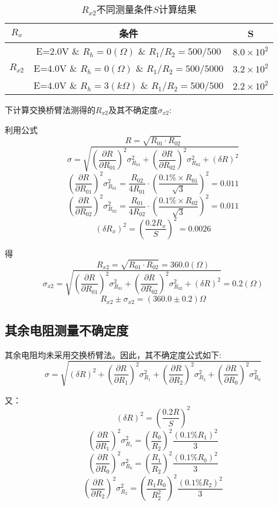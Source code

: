 \documentclass{ctexart}
\begin{document}
\begin{table}[H]
  \centering
  \caption{$R_{x2}$不同测量条件$S$计算结果}
    \begin{tabular}{|c|c|c|}
      \hline
    $R_x$ & 条件    & S \\
    \hline
    \multirow{3}[0]{*}{$R_{x2}$} & E=2.0V \& $R_h=0(\Omega )$ \& $R_1/R_2=500/500$ & $8.0 \times 10^2$ \\
    \cline{2-3}
          & E=4.0V \& $R_h=0(\Omega )$ \& $R_1/R_2=500/5000$ & $3.2 \times 10^2$ \\
          \cline{2-3}
          & E=4.0V \& $R_h=3(k\Omega )$ \& $R_1/R_2=500/500$ & $2.2 \times 10^2$ \\
          
          \hline
    \end{tabular}%
  \label{tab:addlabel}%
\end{table}%

 下计算交换桥臂法测得的$R_{x2}$及其不确定度$\sigma_{x2}$:
 
 利用公式$$R=\sqrt{R_{01}\cdot R_{02}}$$
$$\sigma=\sqrt{(\frac{\partial R}{\partial R_{01}})^2\sigma_{R_{01}}^2+(\frac{\partial R}{\partial R_{02}})^2\sigma_{R_{02}}^2+(\delta R)^2}$$
$$(\frac{\partial R}{\partial R_{01}})^2\sigma_{R_{01}}^2=\frac{R_{02}}{4R_{01}}\cdot (\frac{0.1\% \times R_{01}}{\sqrt{3}})^2=0.011$$
$$(\frac{\partial R}{\partial R_{02}})^2\sigma_{R_{02}}^2=\frac{R_{01}}{4R_{02}}\cdot (\frac{0.1\% \times R_{02}}{\sqrt{3}})^2=0.011$$
$$(\delta R_x)^2=(\frac{0.2R_x}{S})^2=0.0026$$

得
$$R_{x2}=\sqrt{R_{01}\cdot R_{02}}=360.0(\Omega)$$
$$\sigma_{x2}=\sqrt{(\frac{\partial R}{\partial R_{01}})^2\sigma_{R_{01}}^2+(\frac{\partial R}{\partial R_{02}})^2\sigma_{R_{02}}^2+(\delta R)^2}=0.2(\Omega)$$
$$R_{x2}\pm\sigma_{x2}=(360.0\pm0.2)\Omega$$
\subsection{其余电阻测量不确定度}
其余电阻均未采用交换桥臂法。因此，其不确定度公式如下:$$\sigma=\sqrt{(\delta R)^2+(\frac{\partial R}{\partial R_{1}})^2\sigma_{R_{1}}^2+(\frac{\partial R}{\partial R_{2}})^2\sigma_{R_{2}}^2+(\frac{\partial R}{\partial R_{0}})^2\sigma_{R_{0}}^2}$$

又：
$$(\delta R)^2=(\frac{0.2R}{S})^2$$
$$(\frac{\partial R}{\partial R_{1}})^2\sigma_{R_{1}}^2=(\frac{R_0}{R_2})^2\frac{(0.1\% R_1)^2}{3}$$
$$(\frac{\partial R}{\partial R_{0}})^2\sigma_{R_{0}}^2=(\frac{R_1}{R_2})^2\frac{(0.1\% R_0)^2}{3}$$
$$(\frac{\partial R}{\partial R_{2}})^2\sigma_{R_{2}}^2=(\frac{R_1R_0}{R_2^2})^2\frac{(0.1\% R_2)^2}{3}$$
\end{document}
